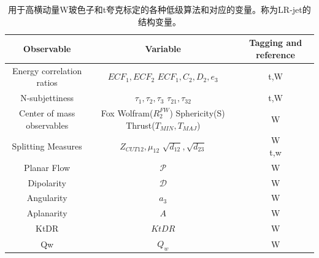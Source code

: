 \begin{table}[ht]
\caption{用于高横动量W玻色子和t夸克标定的各种低级算法和对应的变量。称为LR-jet的结构变量。}
\begin{center}
\begin{adjustbox}{width=\columnwidth,center}
\begin{tabular}{c|c|c}
    \hline
    \hline
    Observable & Variable & Tagging and reference \\
    \hline  
    Energy correlation ratios & \thead{$ECF_1,ECF_2$\\$ECF_1,C_2,D_2,e_3$} & t,W\cite{JSS1,JSS2} \\
    \hline  
    N-subjettiness & \thead{$\tau_1,\tau_2,\tau_3$\\$\tau_{21},\tau_{32}$} & t,W\cite{JSS3,JSS4} \\
    \hline  
    Center of mass observables & \thead{Fox Wolfram($R_2^{FW}$)\\Sphericity(S)\\Thrust($T_{MIN},T_{MAJ}$)} & W\cite{JSS5,JSS6,JSS7}  \\
    \hline  
    Splitting Measures & \thead{$Z_{CUT12},\mu_{12}$\\$\sqrt{d_{12}},\sqrt{d_{23}}$} & \thead{W\cite{JSS8,JSS9}\\t,w\cite{JSS10}} \\
    \hline  
    Planar Flow & $\mathcal{P}$& W\cite{JSS11} \\
    \hline  
    Dipolarity & $\mathcal{D}$ & W\cite{JSS12} \\
    \hline  
    Angularity & $a_3$ & W\cite{JSS13} \\
    \hline  
    Aplanarity & $A$ & W\cite{JSS6} \\
    \hline  
    KtDR & $KtDR$ & W\cite{JSS14} \\
    \hline  
    Qw & $Q_w$ & W\cite{JSS8} \\
    \hline
    \hline
\end{tabular}
\end{adjustbox}
\end{center}
\label{tab:JSS}
\end{table}



